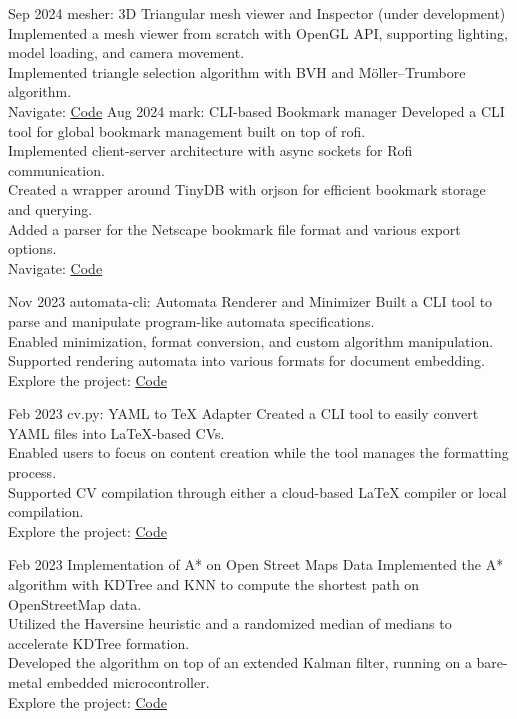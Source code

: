 \documentclass[hidelinks]{report}
\begin{document}
\entry
    {Sep 2024}
    {mesher: 3D Triangular mesh viewer and Inspector}
    {}{(under development)}
    {
        \textbullet Implemented a mesh viewer from scratch with OpenGL API, supporting lighting, model loading, and camera movement.\\
        \textbullet Implemented triangle selection algorithm with BVH and Möller–Trumbore algorithm.\\
        \textbullet Navigate: \href{\github/mesher}{\underline{Code}}
    }
\newpage
\entry
    {Aug 2024}
    {mark: CLI-based Bookmark manager}
    {} {}
    {
    \textbullet Developed a CLI tool for global bookmark management built on top of rofi.\\ 
    \textbullet Implemented client-server architecture with async sockets for Rofi communication.\\
    \textbullet Created a wrapper around TinyDB with orjson for efficient bookmark storage and querying.\\ 
    \textbullet Added a parser for the Netscape bookmark file format and various export options.\\
    \textbullet Navigate: \href{\github/mark}{\underline{Code}}
    }

\entry
    {Nov 2023}
    {automata-cli: Automata Renderer and Minimizer}
    {} {}
    {
    \textbullet Built a CLI tool to parse and manipulate program-like automata specifications. \\ 
    \textbullet Enabled minimization, format conversion, and custom algorithm manipulation. \\ 
    \textbullet Supported rendering automata into various formats for document embedding.\\
    \textbullet Explore the project: \href{\github/automata-cli}{\underline{Code}}
    }

\entry
    {Feb 2023}
    {cv.py: YAML to TeX Adapter}
    {} {}  
    {
    \textbullet Created a CLI tool to easily convert YAML files into LaTeX-based CVs.\\
    \textbullet Enabled users to focus on content creation while the tool manages the formatting process.\\
    \textbullet Supported CV compilation through either a cloud-based LaTeX compiler or local compilation.\\
    \textbullet Explore the project: \href{\github/CV.py}{\underline{Code}}
    }

\entry
    {Feb 2023}
    {Implementation of A* on Open Street Maps Data }
    {} {}    
    {
       \textbullet Implemented the A* algorithm with KDTree and KNN to compute the shortest path on OpenStreetMap data.\\
       \textbullet Utilized the Haversine heuristic and a randomized median of medians to accelerate KDTree formation. \\
       \textbullet Developed the algorithm on top of an extended Kalman filter, running on a bare-metal embedded microcontroller.\\
       \textbullet Explore the project: \href{\github/Astar-OSM}{\underline{Code}}
    }
\end{document}

